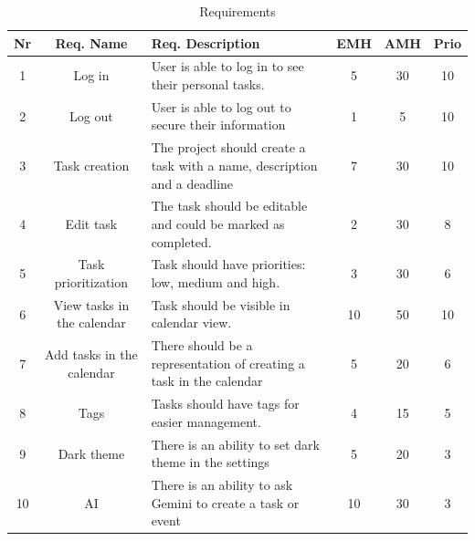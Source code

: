 \documentclass{article}
\begin{document}
\begin{table}[H]
  \centering
  \begin{tabularx}{\textwidth}{|c|c|X|c|c|c|}
    \toprule
    \textbf{Nr} & \textbf{Req. Name}         & \textbf{Req. Description}                                                & \textbf{EMH} & \textbf{AMH} & \textbf{Prio} \\
    \hline
    1           & Log in                     & User is able to log in to see their personal tasks.                      & 5            & 30           & 10            \\    \hline
    2           & Log out                    & User is able to log out to secure their information                      & 1            & 5            & 10            \\    \hline
    3           & Task creation              & The project should create a task with a name, description and a deadline & 7            & 30           & 10            \\
    \hline
    4           & Edit task                  & The task should be editable and could be marked as completed.            & 2            & 30           & 8             \\
    \hline
    5           & Task prioritization        & Task should have priorities: low, medium and high.                       & 3            & 30           & 6             \\
    \hline
    6           & View tasks in the calendar & Task should be visible in calendar view.                                 & 10           & 50           & 10            \\
    \hline
    7           & Add tasks in the calendar  & There should be a representation of creating a task in the calendar      & 5            & 20           & 6             \\
    \hline
    8           & Tags                       & Tasks should have tags for easier management.                            & 4            & 15           & 5             \\
    \hline

    9           & Dark theme                 & There is an ability to set dark theme in the settings                    & 5            & 20           & 3             \\    \hline
    10          & AI                         & There is an ability to ask Gemini to create a task or event              & 10           & 30           & 3             \\

    \bottomrule
  \end{tabularx}
  \caption{Requirements}
  \label{Requirements with EMH, AMH, and priority}
\end{table}
\end{document}
